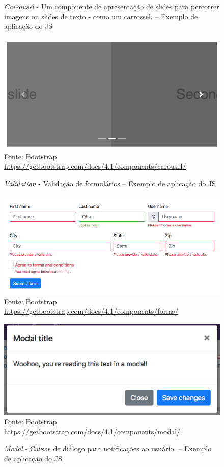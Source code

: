 \documentclass[
	12pt,				%
	openright,			%
	twoside,			%
	a4paper,			%
	english,			%
	brazil				%
	]{abntex2}
\begin{document}
\pagebreak
\begin{figure}[h]
	\centering

	\caption{\textit{Carrousel} - Um componente de apresentação de slides para percorrer imagens ou slides de texto - como um carrossel. -- Exemplo de aplicação do JS} \label{fig:JSExampleCarrousel}
    \includegraphics[scale=0.4]{js-example-carrousel} \\
    Fonte: {Bootstrap \url{https://getbootstrap.com/docs/4.1/components/carousel/}}

    \caption{\textit{Validation} - Validação de formulários -- Exemplo de aplicação do JS} \label{fig:JSExampleValidation}
    \includegraphics[scale=0.45]{js-example-validation} \\
    Fonte: {Bootstrap \url{https://getbootstrap.com/docs/4.1/components/forms/}}
	
    \caption{\textit{Modal} - Caixas de diálogo para notificações ao usuário. -- Exemplo de aplicação do JS} \label{fig:JSExampleModal}
    \includegraphics[scale=0.5]{js-example-modal} \\
    Fonte: {Bootstrap \url{https://getbootstrap.com/docs/4.1/components/modal/}}

\end{figure}
\end{document}
